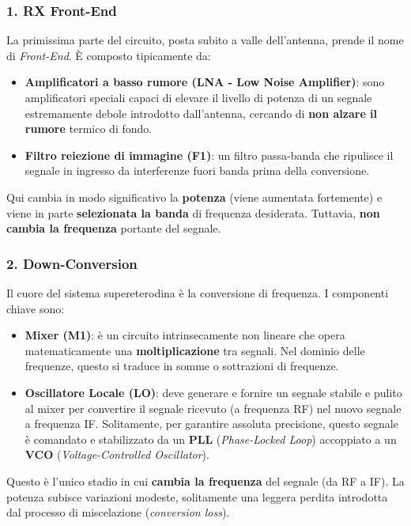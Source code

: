 \documentclass[openany,a4paper,12pt]{book}
\begin{document}
\subsubsection*{1. RX Front-End}
La primissima parte del circuito, posta subito a valle dell'antenna, prende il nome di \textit{Front-End}. È composto tipicamente da:
\begin{itemize}[label=\textcolor{ForestGreen}{\textbullet}]
    \item \textbf{Amplificatori a basso rumore (LNA - Low Noise Amplifier)}: sono amplificatori speciali capaci di elevare il livello di potenza di un segnale estremamente debole introdotto dall'antenna, cercando di \textbf{non alzare il rumore} termico di fondo.
    \item \textbf{Filtro reiezione di immagine (F1)}: un filtro passa-banda che ripulisce il segnale in ingresso da interferenze fuori banda prima della conversione.
\end{itemize}
\begin{nota}[colback=ForestGreen!5, colframe=ForestGreen, title={\textbf{Cosa succede nel Front-End?}}]
    Qui cambia in modo significativo la \textbf{potenza} (viene aumentata fortemente) e viene in parte \textbf{selezionata la banda} di frequenza desiderata. Tuttavia, \textbf{non cambia la frequenza} portante del segnale.
\end{nota}

\subsubsection*{2. Down-Conversion}
Il cuore del sistema supereterodina è la conversione di frequenza. I componenti chiave sono:
\begin{itemize}[label=\textcolor{OpticRed}{\textbullet}]
    \item \textbf{Mixer (M1)}: è un circuito intrinsecamente non lineare che opera matematicamente una \textbf{moltiplicazione} tra segnali. Nel dominio delle frequenze, questo si traduce in somme o sottrazioni di frequenze.
    \item \textbf{Oscillatore Locale (LO)}: deve generare e fornire un segnale stabile e pulito al mixer per convertire il segnale ricevuto (a frequenza RF) nel nuovo segnale a frequenza IF. Solitamente, per garantire assoluta precisione, questo segnale è comandato e stabilizzato da un \textbf{PLL} (\textit{Phase-Locked Loop}) accoppiato a un \textbf{VCO} (\textit{Voltage-Controlled Oscillator}).
\end{itemize}
\begin{nota}[colback=OpticRed!5, colframe=OpticRed, title={\textbf{Cosa succede nella Down-Conversion?}}]
    Questo è l'unico stadio in cui \textbf{cambia la frequenza} del segnale (da RF a IF). La potenza subisce variazioni modeste, solitamente una leggera perdita introdotta dal processo di miscelazione (\textit{conversion loss}).
\end{nota}
\end{document}
